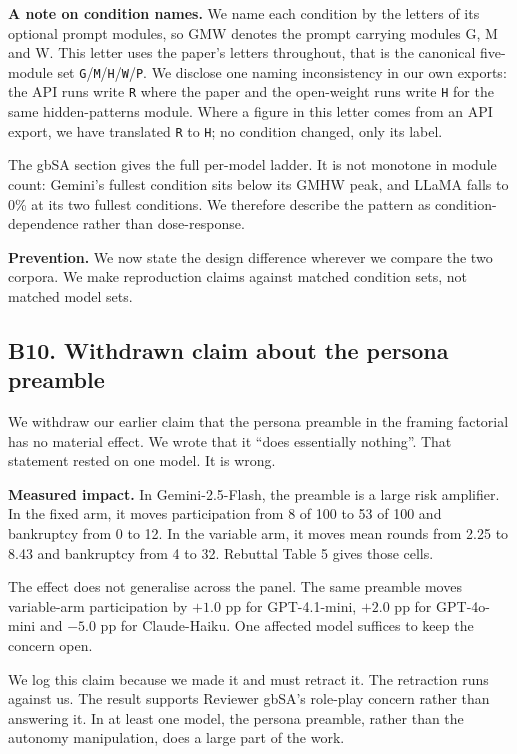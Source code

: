 \textbf{A note on condition names.} We name each condition by the letters of its optional prompt
modules, so GMW denotes the prompt carrying modules G, M and W. This letter uses the paper's
letters throughout, that is the canonical five-module set
\texttt{G}/\texttt{M}/\texttt{H}/\texttt{W}/\texttt{P}. We disclose one naming inconsistency in our
own exports: the API runs write \texttt{R} where the paper and the open-weight runs write
\texttt{H} for the same hidden-patterns module. Where a figure in this letter comes from an API
export, we have translated \texttt{R} to \texttt{H}; no condition changed, only its label.

The gbSA section gives the full per-model ladder. It is not monotone in module count: Gemini's
fullest condition sits below its GMHW peak, and LLaMA falls to 0\% at its two fullest conditions.
We therefore describe the pattern as condition-dependence rather than dose-response.

\textbf{Prevention.} We now state the design difference wherever we compare the two corpora. We
make reproduction claims against matched condition sets, not matched model sets.


\subsection*{B10. Withdrawn claim about the persona preamble}

We withdraw our earlier claim that the persona preamble in the framing factorial has no material
effect. We wrote that it ``does essentially nothing''. That statement rested on one model. It is
wrong.

\textbf{Measured impact.} In Gemini-2.5-Flash, the preamble is a large risk amplifier. In the fixed
arm, it moves participation from 8 of 100 to 53 of 100 and bankruptcy from 0 to 12. In the
variable arm, it moves mean rounds from 2.25 to 8.43 and bankruptcy from 4 to 32. Rebuttal
Table 5 gives those cells.

The effect does not generalise across the panel. The same preamble moves variable-arm
participation by $+1.0$ pp for GPT-4.1-mini, $+2.0$ pp for GPT-4o-mini and $-5.0$ pp for
Claude-Haiku. One affected model suffices to keep the concern open.

We log this claim because we made it and must retract it. The retraction runs against us. The
result supports Reviewer gbSA's role-play concern rather than answering it. In at least one model,
the persona preamble, rather than the autonomy manipulation, does a large part of the work.

